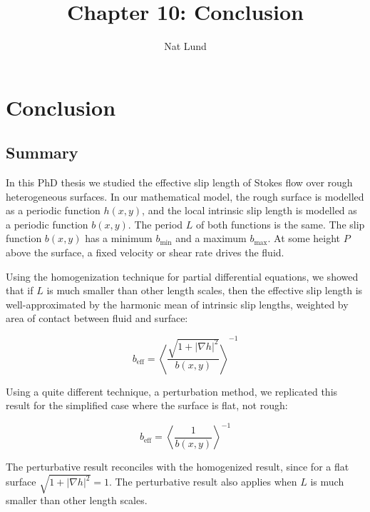 \documentclass[12pt, a4paper, twoside, openright]{book}
\title{Chapter 10: Conclusion}
\author{Nat Lund}
\newcommand{\beff}{\ensuremath{b_{\mathrm{eff}}}}
\newcommand{\bmin}{\ensuremath{b_{\mathrm{min}}}}
\newcommand{\bmax}{\ensuremath{b_{\mathrm{max}}}}
\begin{document}
\chapter{Conclusion}\label{C:conclusion}

\section{Summary}

In this PhD thesis we studied the effective slip length of Stokes flow over rough heterogeneous surfaces.  In our mathematical model, the rough surface is modelled as a periodic function $h(x,y)$, and the local intrinsic slip length is modelled as a periodic function $b(x,y)$.  The period $L$ of both functions is the same.  The slip function $b(x,y)$ has a minimum $\bmin$ and a maximum $\bmax$.  At some height $P$ above the surface, a fixed velocity or shear rate drives the fluid.

Using the homogenization technique for partial differential equations, we showed that if $L$ is much smaller than other length scales, then the effective slip length is well-approximated by the harmonic mean of intrinsic slip lengths, weighted by area of contact between fluid and surface:

\begin{equation}
\beff = \left< \frac{\sqrt{1+ |\nabla h|^2}}{b(x,y)} \right>^{-1}
\end{equation}



\clearpage
Using a quite different technique, a perturbation method, we replicated this result for the simplified case where the surface is flat, not rough:

\begin{equation}
\beff = \left< \frac{1}{b(x,y)} \right>^{-1}
\end{equation}

The perturbative result reconciles with the homogenized result, since for a flat surface $\sqrt{1+ |\nabla h|^2} = 1$.  The perturbative result also applies when $L$ is much smaller than other length scales.
\end{document}

